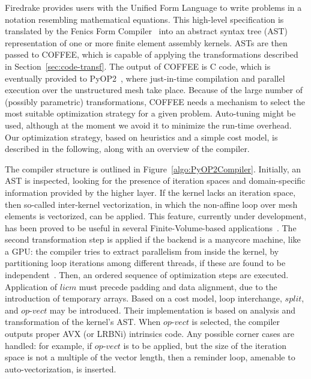 \documentclass[conference]{IEEEtran}
\begin{document}
Firedrake provides users with the Unified Form Language to write problems in a notation resembling mathematical equations. This high-level specification is translated by the Fenics Form Compiler~\cite{FFC-Compiler} into an abstract syntax tree (AST) representation of one or more finite element assembly kernels. ASTs are then passed to COFFEE, which is capable of applying the transformations described in Section~\ref{sec:code-transf}. The output of COFFEE is C code, which is eventually provided to PyOP2~\cite{pyop2isc}, where just-in-time compilation and parallel execution over the unstructured mesh take place. Because of the large number of (possibly parametric) transformations, COFFEE needs a mechanism to select the most suitable optimization strategy for a given problem. Auto-tuning might be used, although at the moment we avoid it to minimize the run-time overhead. Our optimization strategy, based on heuristics and a simple cost model, is described in the following, along with an overview of the compiler.

The compiler structure is outlined in Figure~\ref{algo:PyOP2Compiler}. Initially, an AST is inspected, looking for the presence of iteration spaces and domain-specific information provided by the higher layer. If the kernel lacks an iteration space, then so-called inter-kernel vectorization, in which the non-affine loop over mesh elements is vectorized, can be applied. This feature, currently under development, has been proved to be useful in several Finite-Volume-based applications~\cite{inter-kernel-vect}. The second transformation step is applied if the backend is a manycore machine, like a GPU: the compiler tries to extract parallelism from inside the kernel, by partitioning loop iterations among different threads, if these are found to be independent~\cite{pyop2isc}. Then, an ordered sequence of optimization steps are executed. Application of $licm$ must precede padding and data alignment, due to the introduction of temporary arrays. Based on a cost model, loop interchange, $split$, and $op$-$vect$ may be introduced. Their implementation is based on analysis and transformation of the kernel's AST. When $op$-$vect$ is selected, the compiler outputs proper AVX (or LRBNi) intrinsics code. Any possible corner cases are handled: for example, if $op$-$vect$ is to be applied, but the size of the iteration space is not a multiple of the vector length, then a reminder loop, amenable to auto-vectorization, is inserted. 
\end{document}
